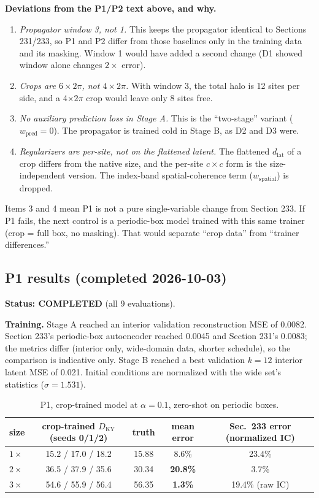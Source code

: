 \documentclass[11pt]{article}
\begin{document}
\textbf{Deviations from the P1/P2 text above, and why.}
\begin{enumerate}[leftmargin=*]
\item \emph{Propagator window 3, not 1.} This keeps the propagator
  identical to Sections 231/233, so P1 and P2 differ from those baselines
  only in the training data and its masking. Window 1 would have added a
  second change (D1 showed window alone changes $2\times$ error).
\item \emph{Crops are $6\times2\pi$, not $4\times2\pi$.} With window 3,
  the total halo is 12 sites per side, and a 4$\times2\pi$ crop would
  leave only 8 sites free.
\item \emph{No auxiliary prediction loss in Stage A.} This is the
  ``two-stage'' variant ($w_{\mathrm{pred}}{=}0$). The propagator is
  trained cold in Stage B, as D2 and D3 were.
\item \emph{Regularizers are per-site, not on the flattened latent.} The
  flattened $d_{\mathrm{lat}}$ of a crop differs from the native size,
  and the per-site $c{\times}c$ form is the size-independent version. The
  index-band spatial-coherence term ($w_{\mathrm{spatial}}$) is dropped.
\end{enumerate}
Items 3 and 4 mean P1 is not a pure single-variable change from Section
233. If P1 fails, the next control is a periodic-box model trained with
this same trainer (crop = full box, no masking). That would separate
``crop data'' from ``trainer differences.''

\subsection{P1 results (completed 2026-10-03)}
\label{sec:p1_results}

\textbf{Status: COMPLETED} (all 9 evaluations).

\textbf{Training.} Stage A reached an interior validation reconstruction
MSE of 0.0082. Section 233's periodic-box autoencoder reached 0.0045 and
Section 231's 0.0083; the metrics differ (interior only, wide-domain data,
shorter schedule), so the comparison is indicative only. Stage B reached
a best validation $k{=}12$ interior latent MSE of 0.021. Initial
conditions are normalized with the wide set's statistics
($\sigma{=}1.531$).

\begin{table}[h]
\centering
\small
\begin{tabular}{lcccc}
\toprule
size & crop-trained $D_{\mathrm{KY}}$ (seeds 0/1/2) & truth & mean error & Sec.\ 233 error (normalized IC) \\
\midrule
$1\times$ & 15.2 / 17.0 / 18.2 & 15.88 & 8.6\% & 23.4\% \\
$2\times$ & 36.5 / 37.9 / 35.6 & 30.34 & \textbf{20.8\%} & 3.7\% \\
$3\times$ & 54.6 / 55.9 / 56.4 & 56.35 & \textbf{1.3\%} & 19.4\% (raw IC) \\
\bottomrule
\end{tabular}
\caption{P1, crop-trained model at $\alpha{=}0.1$, zero-shot on periodic
boxes.}
\label{tab:p1}
\end{table}
\end{document}

